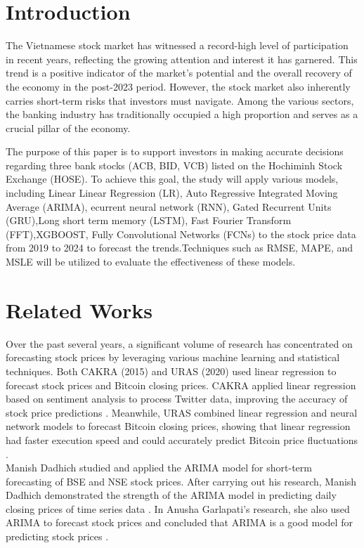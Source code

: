 \documentclass{ieeeojies}
\begin{document}
\section{Introduction}
\label{sec:introduction}

The Vietnamese stock market has witnessed a record-high level of participation in recent years, reflecting the growing attention and interest it has garnered. This trend is a positive indicator of the market's potential and the overall recovery of the economy in the post-2023 period. However, the stock market also inherently carries short-term risks that investors must navigate. Among the various sectors, the banking industry has traditionally occupied a high proportion and serves as a crucial pillar of the economy.

The purpose of this paper is to support investors in making accurate decisions regarding three bank stocks (ACB, BID, VCB) listed on the Hochiminh Stock Exchange (HOSE).
To achieve this goal, the study will apply various models, including Linear Linear Regression (LR), Auto Regressive Integrated Moving Average (ARIMA), ecurrent neural network (RNN), Gated Recurrent Units (GRU),Long short term memory (LSTM), Fast Fourier Transform (FFT),XGBOOST, Fully Convolutional Networks (FCNs) to the stock price data from 2019 to 2024 to forecast the trends.Techniques such as RMSE, MAPE, and MSLE will be utilized to evaluate the effectiveness of these models.
\section{Related Works}
Over the past several years, a significant volume of research has concentrated on forecasting stock prices by leveraging various machine learning and statistical techniques. Both CAKRA (2015) and URAS (2020) used linear regression to forecast stock prices and Bitcoin closing prices. CAKRA applied linear regression based on sentiment analysis to process Twitter data, improving the accuracy of stock price predictions \cite{cakra2015stock}. Meanwhile, URAS combined linear regression and neural network models to forecast Bitcoin closing prices, showing that linear regression had faster execution speed and could accurately predict Bitcoin price fluctuations \cite{uras2020forecasting}.\\

Manish Dadhich studied and applied the ARIMA model for short-term forecasting of BSE and NSE stock prices. After carrying out his research, Manish Dadhich demonstrated the strength of the ARIMA model in predicting daily closing prices of time series data \cite{dadhich2021predictive}. In Anusha Garlapati's research, she also used ARIMA to forecast stock prices and concluded that ARIMA is a good model for predicting stock prices \cite{garlapati2021stock}.\\ 
\end{document}
